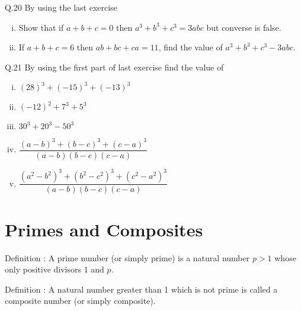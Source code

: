 Q.20 By using the last exercise
\begin{enumerate}[(i)]
\item Show that if $a+b+c = 0$ then $a^3+b^3+c^3 = 3abc$ but converse is false.
\item If $a+b+c = 6$ then $ab+bc+ca = 11$, find the value of $a^3+b^3+c^3-3abc$.
\end{enumerate}
\noindent Q.21 By using the first part of last exercise find the value of
\begin{multicols}{2}
\begin{enumerate}[(i)]
\item $(28)^3+(-15)^3+(-13)^3$
\item $(-12)^2+7^3+5^3$
\item $30^3+20^3-50^3$
\item $\dfrac{(a-b)^3+(b-c)^3+(c-a)^3}{(a-b)(b-c)(c-a)}$
\item $\dfrac{(a^2-b^2)^3+(b^2-c^2)^3+(c^2-a^2)^3}{(a-b)(b-c)(c-a)}$
\end{enumerate}
\end{multicols}
\section{Primes and Composites}
\begin{tcolorbox}
Definition : A prime number (or simply prime) is a natural number $p >1$ whose only positive divisors 1 and $p$.
\end{tcolorbox}
\begin{tcolorbox}
Definition : A natural number greater than 1 which is not prime is called
a composite number (or simply composite).
\end{tcolorbox}
\noindent {}\\\\
\\\\
